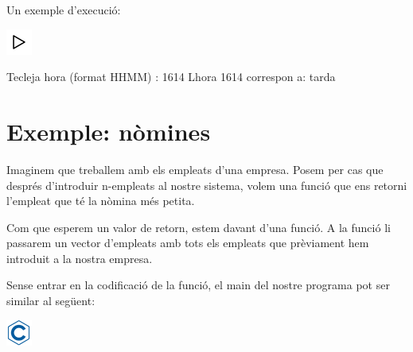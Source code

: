 \documentclass[]{book}
\newenvironment{Shaded}{\begin{snugshade}}{\end{snugshade}}
\newcommand{\DecValTok}[1]{\textcolor[rgb]{0.00,0.00,0.81}{#1}}
\newcommand{\NormalTok}[1]{#1}
\begin{document}
Un exemple d'execució:

\includegraphics{./img/play.png}

\begin{Shaded}
\begin{Highlighting}[]
\NormalTok{Tecleja hora (format HHMM) : }\DecValTok{1614}
\NormalTok{L\textquotesingle{}hora }\DecValTok{1614}\NormalTok{ correspon a: tarda}
\end{Highlighting}
\end{Shaded}

\hypertarget{exemple-nomines-1}{%
\section{Exemple: nòmines}\label{exemple-nomines-1}}

Imaginem que treballem amb els empleats d'una empresa. Posem per cas que després d'introduir n-empleats al nostre sistema, volem una funció que ens retorni l'empleat que té la nòmina més petita.

Com que esperem un valor de retorn, estem davant d'una funció. A la funció li passarem un vector d'empleats amb tots els empleats que prèviament hem introduit a la nostra empresa.

Sense entrar en la codificació de la funció, el main del nostre programa pot ser similar al següent:

\includegraphics{./img/c.png}
\end{document}
